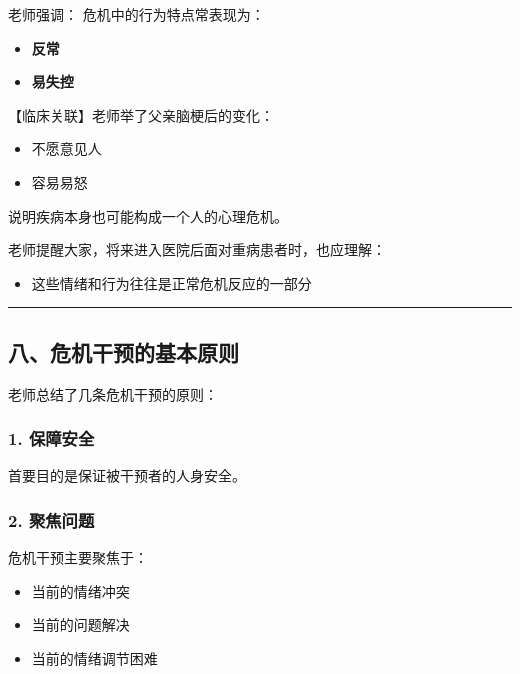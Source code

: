 \documentclass[
  chinese,
  9pt,
  a4paper,
]{ctexart}
\providecommand{\tightlist}{%
  \setlength{\itemsep}{0pt}\setlength{\parskip}{0pt}}
\begin{document}
老师强调： 危机中的行为特点常表现为：

\begin{itemize}
\tightlist
\item
  \textbf{反常}
\item
  \textbf{易失控}
\end{itemize}

【临床关联】老师举了父亲脑梗后的变化：

\begin{itemize}
\tightlist
\item
  不愿意见人
\item
  容易易怒
\end{itemize}

说明疾病本身也可能构成一个人的心理危机。

老师提醒大家，将来进入医院后面对重病患者时，也应理解：

\begin{itemize}
\tightlist
\item
  这些情绪和行为往往是正常危机反应的一部分
\end{itemize}

\begin{center}\rule{0.5\linewidth}{0.5pt}\end{center}

\subsection{八、危机干预的基本原则}\label{ux516bux5371ux673aux5e72ux9884ux7684ux57faux672cux539fux5219}

老师总结了几条危机干预的原则：

\subsubsection{1. 保障安全}\label{ux4fddux969cux5b89ux5168}

首要目的是保证被干预者的人身安全。

\subsubsection{2. 聚焦问题}\label{ux805aux7126ux95eeux9898}

危机干预主要聚焦于：

\begin{itemize}
\tightlist
\item
  当前的情绪冲突
\item
  当前的问题解决
\item
  当前的情绪调节困难
\end{itemize}
\end{document}
